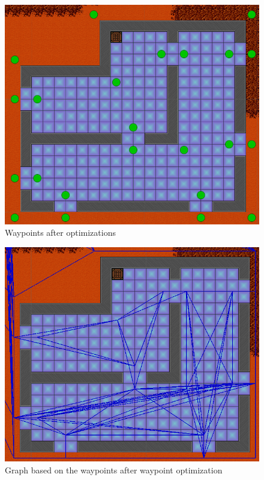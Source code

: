 \begin{figure}[H]
	\includegraphics[width=\textwidth]{figures/astar/optimizedWaypoints}
	\caption{Waypoints after optimizations}
	\label{waypointOpt}
\end{figure}

\begin{figure}[H]
	\includegraphics[width=\textwidth]{figures/astar/optimizedWaypointsGraph}
	\caption{Graph based on the waypoints after waypoint optimization}
	\label{waypointgraphOpt}
\end{figure}



